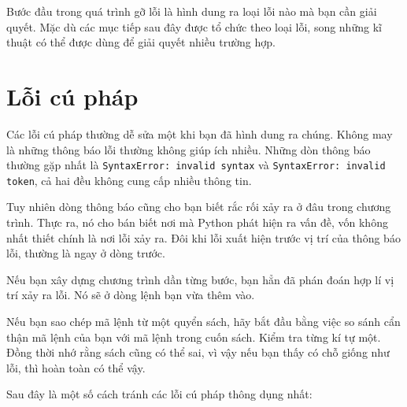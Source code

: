 \documentclass[11pt]{book}
\begin{document}

Bước đầu trong quá trình gỡ lỗi là hình dung ra loại lỗi nào mà bạn 
cần giải quyết. Mặc dù các mục tiếp sau đây được tổ chức theo
loại lỗi, song những kĩ thuật có thể được dùng để giải quyết 
nhiều trường hợp.


\section{Lỗi cú pháp}


Các lỗi cú pháp thường dễ sửa một khi bạn đã hình dung ra chúng.
Không may là những thông báo lỗi thường không giúp ích nhiều.
Những dòn thông báo thường gặp nhất là {\tt SyntaxError: invalid syntax} và
{\tt SyntaxError: invalid token}, cả hai đều không cung cấp nhiều thông tin.

Tuy nhiên dòng thông báo cũng cho bạn biết rắc rối xảy ra ở đâu trong
chương trình. Thực ra, nó cho bán biết nơi mà Python phát hiện ra vấn đề,
vốn không nhất thiết chính là nơi lỗi xảy ra.
Đôi khi lỗi xuất hiện trước vị trí của thông báo lỗi, thường là
ngay ở dòng trước.


Nếu bạn xây dựng chương trình dần từng bước, bạn hẳn đã 
phán đoán hợp lí vị trí xảy ra lỗi. Nó sẽ ở dòng lệnh bạn vừa thêm vào.

Nếu bạn sao chép mã lệnh từ một quyển sách, hãy bắt đầu
bằng việc so sánh cẩn thận mã lệnh của bạn với mã lệnh trong cuốn sách.
Kiểm tra từng kí tự một. Đồng thời nhớ rằng sách cũng có thể sai,
vì vậy nếu bạn thấy có chỗ giống như lỗi, thì hoàn toàn có thể vậy.

Sau đây là một số cách tránh các lỗi cú pháp thông dụng nhất:

\end{document}
